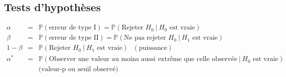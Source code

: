 \documentclass[12pt,french]{article}
\begin{document}
\subsection*{Tests d'hypothèses}

\vspace{-0.1in}
\begin{eqnarray*}
\alpha &=& \mathbb{P}\left(\mbox{erreur de type I}\right)
= \mathbb{P}\left(\mbox{Rejeter }H_0~|~H_0\mbox{ est vraie}\right)
\\
\beta &=& \mathbb{P}\left(\mbox{erreur de type II}\right)=
\mathbb{P}\left(\mbox{Ne pas rejeter }H_0~|~H_1\mbox{ est
vraie}\right)\\
1-\beta&=&\mathbb{P}\left(\mbox{Rejeter }H_0~|~H_1\mbox{ est vraie}\right) \mbox{  } (\mbox{puissance} )\\
\alpha^* &=& \mathbb{P}\left(\mbox{Observer une valeur au moins aussi extrême que celle observée}~|~H_0\mbox{ est vraie}\right) \\
&& \mbox{(valeur-p ou seuil observé)}
\end{eqnarray*}
\end{document}
